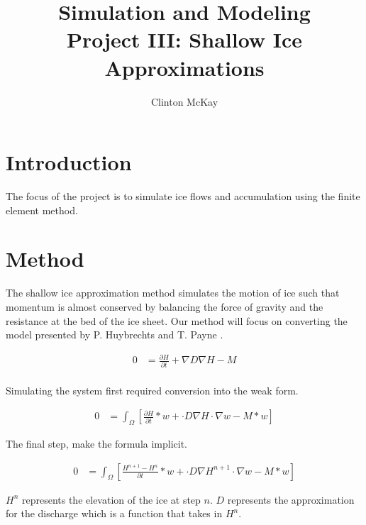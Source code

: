 \documentclass{article}%
\begin{document}
    \title{Simulation and Modeling\\Project III: Shallow Ice Approximations}
    \author{Clinton McKay}
    \maketitle

    \twocolumn

    \section{Introduction}
    The focus of the project is to simulate ice flows and accumulation using the finite element method. 

    \section{Method}
    The shallow ice approximation method simulates the motion of ice such that momentum is almost conserved by balancing the force of gravity and the resistance at the bed of the ice sheet. Our method will focus on converting the model presented by P. Huybrechts and T. Payne \cite{3}.

    \begin{align}
       0 &= \frac{\partial H}{\partial t} + \nabla D \nabla H - M\\
    \end{align}

    Simulating the system first required conversion into the weak form. 

    \begin{align}
        0 &= \int_\Omega\left[\frac{\partial H}{\partial t} * w + \cdot D \nabla H \cdot \nabla{w} - M * w\right]
    \end{align}

    The final step, make the formula implicit. 
 
    \begin{align}
        0 &= \int_\Omega\left[\frac{H^{n + 1} - H^n}{\partial t} * w + \cdot D \nabla H^{n + 1} \cdot \nabla{w} - M * w\right]
    \end{align}

    $H^n$ represents the elevation of the ice at step $n$. $D$ represents the approximation for the discharge which is a function that takes in $H^n$. 
\end{document}
